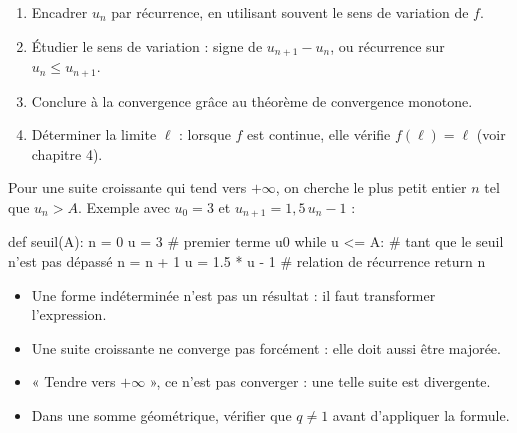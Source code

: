 \begin{savoirfaire}[Étudier une suite $u_{n+1}=f(u_n)$]
\begin{enumerate}[label=\otLabel{\arabic*.},leftmargin=1.6em,itemsep=0.6mm,topsep=0.5mm]
  \item Encadrer $u_n$ par récurrence, en utilisant souvent le sens de variation de $f$.
  \item Étudier le sens de variation : signe de $u_{n+1}-u_n$, ou récurrence sur $u_n\leq u_{n+1}$.
  \item Conclure à la convergence grâce au théorème de convergence monotone.
  \item Déterminer la limite $\ell$ : lorsque $f$ est continue, elle vérifie $f(\ell)=\ell$ (voir chapitre 4).
\end{enumerate}
\end{savoirfaire}


Pour une suite croissante qui tend vers $+\infty$, on cherche le plus petit entier $n$ tel que
$u_n>A$. Exemple avec $u_0=3$ et $u_{n+1}=1{,}5\,u_n-1$ :

\begin{python}
def seuil(A):
    n = 0
    u = 3                  # premier terme u0
    while u <= A:          # tant que le seuil n'est pas dépassé
        n = n + 1
        u = 1.5 * u - 1    # relation de récurrence
    return n
\end{python}

\begin{attention}
\begin{itemize}[label={\color{otOrange}\textbullet},leftmargin=1.4em,itemsep=0.6mm,topsep=0.5mm]
  \item Une forme indéterminée n'est pas un résultat : il faut transformer l'expression.
  \item Une suite croissante ne converge pas forcément : elle doit aussi être majorée.
  \item « Tendre vers $+\infty$ », ce n'est pas converger : une telle suite est divergente.
  \item Dans une somme géométrique, vérifier que $q\neq1$ avant d'appliquer la formule.
\end{itemize}
\end{attention}

\exercices
{}


